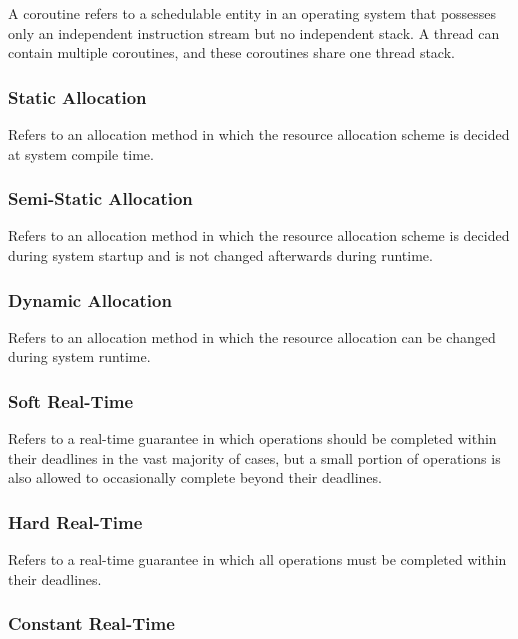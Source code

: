 A coroutine refers to a schedulable entity in an operating system that possesses only an independent instruction stream but no independent stack. A thread can contain multiple coroutines, and these coroutines share one thread stack.

\subsubsection{Static Allocation}\label{subsubsec:1-static-allocation}

Refers to an allocation method in which the resource allocation scheme is decided at system compile time.

\subsubsection{Semi-Static Allocation}\label{subsubsec:1-semi-static-allocation}

Refers to an allocation method in which the resource allocation scheme is decided during system startup and is not changed afterwards during runtime.

\subsubsection{Dynamic Allocation}\label{subsubsec:1-dynamic-allocation}

Refers to an allocation method in which the resource allocation can be changed during system runtime.

\subsubsection{Soft Real-Time}\label{subsubsec:1-soft-real-time}

Refers to a real-time guarantee in which operations should be completed within their deadlines in the vast majority of cases, but a small portion of operations is also allowed to occasionally complete beyond their deadlines.

\subsubsection{Hard Real-Time}\label{subsubsec:1-hard-real-time}

Refers to a real-time guarantee in which all operations must be completed within their deadlines.

\subsubsection{Constant Real-Time}\label{subsubsec:1-constant-real-time}

